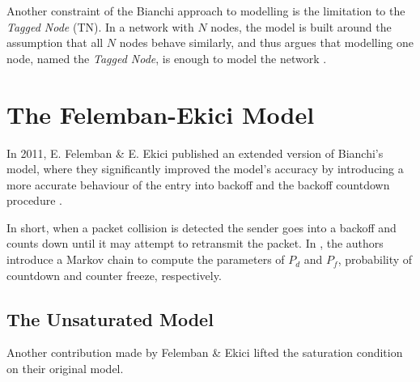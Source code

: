 Another constraint of the Bianchi approach to modelling is the limitation to the \emph{Tagged Node} (TN). In a network with $N$ nodes, the model is built around the assumption that all $N$ nodes behave similarly, and thus argues that modelling one node, named the \emph{Tagged Node}, is enough to model the network \cite{bianchi}.

\section{The Felemban-Ekici Model}

In 2011, E. Felemban \& E. Ekici published an extended version of Bianchi's model, where they significantly improved the model's accuracy by introducing a more accurate behaviour of the entry into backoff and the backoff countdown procedure \cite{felemban}.

In short, when a packet collision is detected the sender goes into a backoff and counts down until it may attempt to retransmit the packet. In \cite{felemban}, the authors introduce a Markov chain to compute the parameters of $P_d$ and $P_f$, probability of countdown and counter freeze, respectively.

\subsection{The Unsaturated Model}

Another contribution made by Felemban \& Ekici lifted the saturation condition on their original model.
